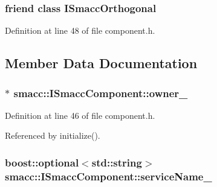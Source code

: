 \subsubsection[{\texorpdfstring{I\+Smacc\+Orthogonal}{ISmaccOrthogonal}}]{\setlength{\rightskip}{0pt plus 5cm}friend class {\bf I\+Smacc\+Orthogonal}\hspace{0.3cm}{\ttfamily [friend]}}\hypertarget{classsmacc_1_1ISmaccComponent_a7205cc84a71fea903124d54d01e99a68}{}\label{classsmacc_1_1ISmaccComponent_a7205cc84a71fea903124d54d01e99a68}


Definition at line 48 of file component.\+h.



\subsection{Member Data Documentation}
\subsubsection[{\texorpdfstring{owner\+\_\+}{owner_}}]{$\ast$ smacc\+::\+I\+Smacc\+Component\+::owner\+\_\+\hspace{0.3cm}{\ttfamily [protected]}}\hypertarget{classsmacc_1_1ISmaccComponent_a909590e672450ce0eb0d8facb45c737a}{}\label{classsmacc_1_1ISmaccComponent_a909590e672450ce0eb0d8facb45c737a}


Definition at line 46 of file component.\+h.



Referenced by initialize().

\subsubsection[{\texorpdfstring{service\+Name\+\_\+}{serviceName_}}]{\setlength{\rightskip}{0pt plus 5cm}boost\+::optional$<$std\+::string$>$ smacc\+::\+I\+Smacc\+Component\+::service\+Name\+\_\+\hspace{0.3cm}{\ttfamily [protected]}}\hypertarget{classsmacc_1_1ISmaccComponent_a25de6450f3cd86d0e93bf356b5b43595}{}\label{classsmacc_1_1ISmaccComponent_a25de6450f3cd86d0e93bf356b5b43595}


